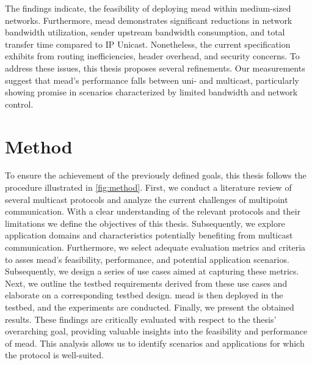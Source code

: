 The findings indicate, the feasibility of deploying \gls{mead} within
    medium-sized networks.
Furthermore, \gls{mead} demonstrates significant reductions in network bandwidth
    utilization, sender upstream bandwidth consumption, and total transfer time
    compared to IP Unicast.
Nonetheless, the current specification exhibits from routing inefficiencies,
    header overhead, and security concerns.
To address these issues, this thesis proposes several refinements. 
Our measurements suggest that \gls{mead}'s performance falls between uni- and
    multicast, particularly showing promise in scenarios characterized by
    limited bandwidth and network control.



\section{Method} %
\label{sec:Method}
To ensure the achievement of the previously defined goals, this thesis follows
    the procedure illustrated in \autoref{fig:method}.
First, we conduct a literature review of several multicast protocols and
    analyze the current challenges of multipoint communication.
With a clear understanding of the relevant protocols and their limitations we
    define the objectives of this thesis.
Subsequently, we explore application domains and characteristics potentially 
    benefiting from multicast communication.
Furthermore, we select adequate evaluation metrics and criteria to asses
    \gls{mead}'s feasibility, performance, and potential application scenarios.
Subsequently, we design a series of use cases aimed at capturing these
    metrics.
Next, we outline the testbed requirements derived from these use cases and
    elaborate on a corresponding testbed design.
\gls{mead} is then deployed in the testbed, and the experiments are conducted.
Finally, we present the obtained results.
These findings are critically evaluated with respect to the thesis' overarching
    goal, providing valuable insights into the feasibility and performance of
    \gls{mead}.
This analysis allows us to identify scenarios and applications for which the
    protocol is well-suited.


